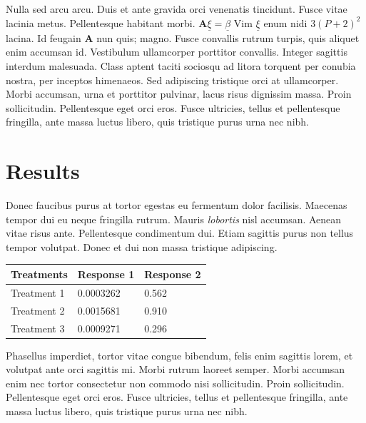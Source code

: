 \documentclass[a0,landscape]{a0poster}
\begin{document}
\begin{multicols}{3}
Nulla sed arcu arcu. Duis et ante gravida orci venenatis tincidunt. Fusce vitae lacinia metus. Pellentesque habitant morbi. $\mathbf{A}\underline{\xi}=\underline{\beta}$ Vim $\underline{\xi}$ enum nidi $3(P+2)^{2}$ lacina. Id feugain $\mathbf{A}$ nun quis; magno. Fusce convallis rutrum turpis, quis aliquet enim accumsan id. Vestibulum ullamcorper porttitor convallis. Integer sagittis interdum malesuada. Class aptent taciti sociosqu ad litora torquent per conubia nostra, per inceptos himenaeos. Sed adipiscing tristique orci at ullamcorper. Morbi accumsan, urna et porttitor pulvinar, lacus risus dignissim massa. Proin sollicitudin. Pellentesque eget orci eros. Fusce ultricies, tellus et pellentesque fringilla, ante massa luctus libero, quis tristique purus urna nec nibh.


\section*{Results}

Donec faucibus purus at tortor egestas eu fermentum dolor facilisis. Maecenas tempor dui eu neque fringilla rutrum. Mauris \emph{lobortis} nisl accumsan. Aenean vitae risus ante. Pellentesque condimentum dui. Etiam sagittis purus non tellus tempor volutpat. Donec et dui non massa tristique adipiscing.
%
\begin{table} %
\begin{tabular}{l l l}
\toprule
\textbf{Treatments} & \textbf{Response 1} & \textbf{Response 2}\\
\midrule
Treatment 1 & 0.0003262 & 0.562 \\
Treatment 2 & 0.0015681 & 0.910 \\
Treatment 3 & 0.0009271 & 0.296 \\
\bottomrule
\end{tabular}
\end{table}
%
Phasellus imperdiet, tortor vitae congue bibendum, felis enim sagittis lorem, et volutpat ante orci sagittis mi. Morbi rutrum laoreet semper. Morbi accumsan enim nec tortor consectetur non commodo nisi sollicitudin. Proin sollicitudin. Pellentesque eget orci eros. Fusce ultricies, tellus et pellentesque fringilla, ante massa luctus libero, quis tristique purus urna nec nibh.


\end{multicols}
\end{document}
